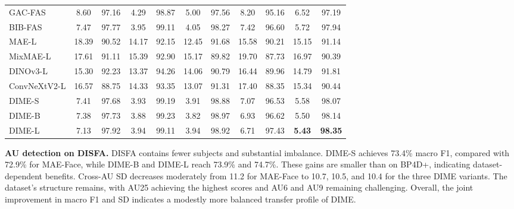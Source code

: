 \documentclass[10pt,journal,compsoc]{IEEEtran}
\newcommand{\BestScore}[1]{\textcolor{DIMEBestText}{#1}}
\newcommand{\SecondScore}[1]{\textcolor{DIMESecondText}{#1}}
\begin{document}
\begin{table}[t!]
{\begin{tabular}{@{}l*{5}{cc}@{}}
    GAC-FAS \cite{le2024gradient}
    & 8.60 & 97.16
    & 4.29 & 98.87
    & 5.00 & 97.56
    & 8.20 & 95.16
    & 6.52 & 97.19 \\

    BIB-FAS \cite{yu2025learning}
    & 7.47 & \SecondScore{97.77}
    & 3.95 & 99.11
    & 4.05 & 98.27
    & 7.42 & 96.60
    & 5.72 & 97.94 \\
    \midrule

    MAE-L \cite{he2022masked}
    & 18.39 & 90.52
    & 14.17 & 92.15
    & 12.45 & 91.68
    & 15.58 & 90.21
    & 15.15 & 91.14 \\

    MixMAE-L \cite{liu2023mixmae}
    & 17.61 & 91.11
    & 15.39 & 92.90
    & 15.17 & 89.82
    & 19.70 & 87.73
    & 16.97 & 90.39 \\

    DINOv3-L \cite{simeoni2025dinov3}
    & 15.30 & 92.23
    & 13.37 & 94.26
    & 14.06 & 90.79
    & 16.44 & 89.96
    & 14.79 & 91.81 \\

    ConvNeXtV2-L \cite{woo2023convnext}
    & 16.57 & 88.75
    & 14.33 & 93.35
    & 13.07 & 91.31
    & 17.40 & 88.35
    & 15.34 & 90.44 \\
    \midrule

    DIME-S
    & 7.41 & 97.68
    & \SecondScore{3.93} & \SecondScore{99.19}
    & \SecondScore{3.91} & 98.88
    & 7.07 & 96.53
    & 5.58 & 98.07 \\

    DIME-B
    & \SecondScore{7.38} & 97.73
    & \BestScore{3.88} & \BestScore{99.23}
    & \BestScore{3.82} & \BestScore{98.97}
    & \SecondScore{6.93} & 96.62
    & \SecondScore{5.50} & \SecondScore{98.14} \\

    DIME-L
    & \BestScore{7.13} & \BestScore{97.92}
    & 3.94 & 99.11
    & 3.94 & \SecondScore{98.92}
    & \BestScore{6.71} & \BestScore{97.43}
    & \BestScore{\textbf{5.43}} & \BestScore{\textbf{98.35}} \\

    \bottomrule
  \end{tabular}%
  }
  \vspace{-1.5em}
\end{table}

\noindent\textbf{AU detection on DISFA.} DISFA contains fewer subjects and substantial imbalance. DIME-S achieves 73.4\% macro F1, compared with 72.9\% for MAE-Face, while DIME-B and DIME-L reach 73.9\% and 74.7\%. These gains are smaller than on BP4D+, indicating dataset-dependent benefits. Cross-AU SD decreases moderately from 11.2 for MAE-Face to 10.7, 10.5, and 10.4 for the three DIME variants. The dataset's structure remains, with AU25 achieving the highest scores and AU6 and AU9 remaining challenging. Overall, the joint improvement in macro F1 and SD indicates a modestly more balanced transfer profile of DIME.
\end{document}
